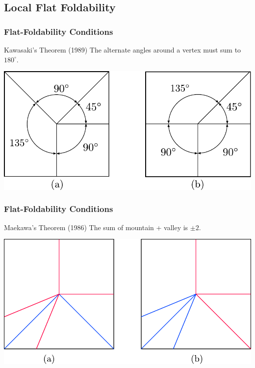 \documentclass{beamer}
\begin{document}
\subsection{Local Flat Foldability}

\begin{frame}
\frametitle{Flat-Foldability Conditions}
\begin{block}{Kawasaki's Theorem (1989)}
The alternate angles around a vertex must sum to $180^\circ$.
\end{block}
\includegraphics[width=\textwidth]{foldability_pix/kawasaki_passfail.pdf}
\end{frame}


\begin{frame}
\frametitle{Flat-Foldability Conditions}
\begin{block}{Maekawa's Theorem (1986)}
The sum of mountain + valley is $\pm 2$. 
\end{block}
\includegraphics[width=\textwidth]{foldability_pix/maekawa_img.pdf}
\end{frame}
\end{document}
